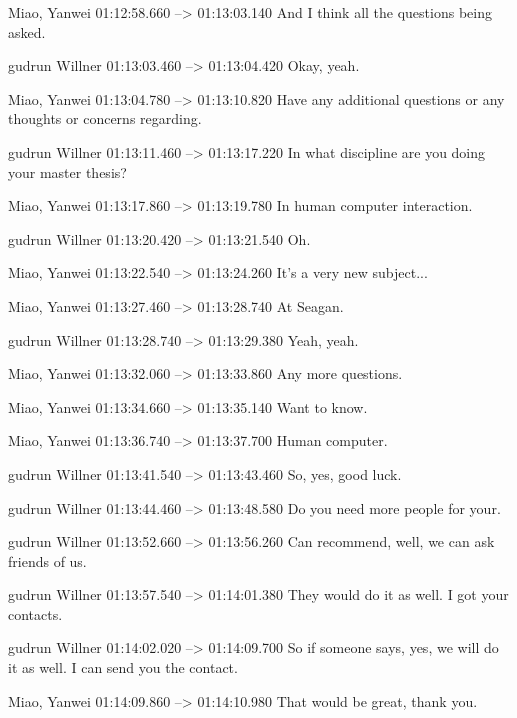 {Miao, Yanwei 01:12:58.660 --> 01:13:03.140
And I think all the questions being asked.

gudrun Willner 01:13:03.460 --> 01:13:04.420
Okay, yeah.

Miao, Yanwei 01:13:04.780 --> 01:13:10.820
Have any additional questions or any thoughts or concerns regarding.

gudrun Willner 01:13:11.460 --> 01:13:17.220
In what discipline are you doing your master thesis?

Miao, Yanwei 01:13:17.860 --> 01:13:19.780
In human computer interaction.

gudrun Willner 01:13:20.420 --> 01:13:21.540
Oh.

Miao, Yanwei 01:13:22.540 --> 01:13:24.260
It's a very new subject...

Miao, Yanwei 01:13:27.460 --> 01:13:28.740
At Seagan.

gudrun Willner 01:13:28.740 --> 01:13:29.380
Yeah, yeah.

Miao, Yanwei 01:13:32.060 --> 01:13:33.860
Any more questions.

Miao, Yanwei 01:13:34.660 --> 01:13:35.140
Want to know.

Miao, Yanwei 01:13:36.740 --> 01:13:37.700
Human computer.

gudrun Willner 01:13:41.540 --> 01:13:43.460
So, yes, good luck.

gudrun Willner 01:13:44.460 --> 01:13:48.580
Do you need more people for your.

gudrun Willner 01:13:52.660 --> 01:13:56.260
Can recommend, well, we can ask friends of us.

gudrun Willner 01:13:57.540 --> 01:14:01.380
They would do it as well. I got your contacts.

gudrun Willner 01:14:02.020 --> 01:14:09.700
So if someone says, yes, we will do it as well. I can send you the contact.

Miao, Yanwei 01:14:09.860 --> 01:14:10.980
That would be great, thank you.
}